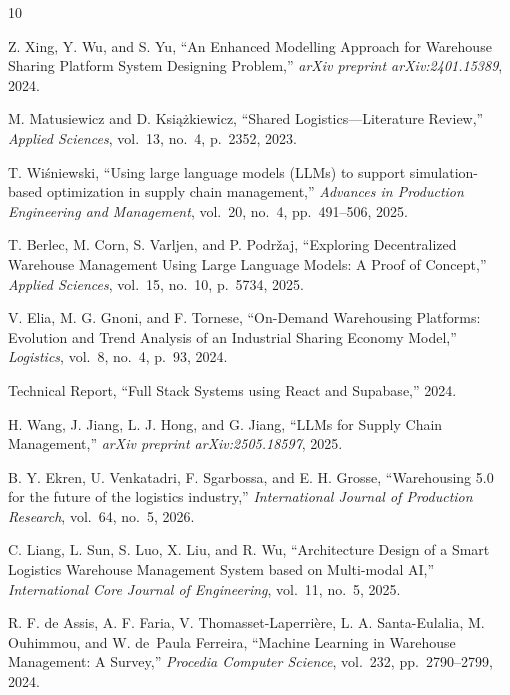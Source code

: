 \documentclass[pdflatex,sn-mathphys-num]{sn-jnl}
\theoremstyle{thmstyleone}
\theoremstyle{thmstyletwo}
\theoremstyle{thmstylethree}
\begin{document}

\begin{thebibliography}{10}

Z. Xing, Y. Wu, and S. Yu,
``An Enhanced Modelling Approach for Warehouse Sharing Platform
System Designing Problem,''
\textit{arXiv preprint arXiv:2401.15389},
2024.

M. Matusiewicz and D. Ksi\k{a}\.zkiewicz,
``Shared Logistics---Literature Review,''
\textit{Applied Sciences},
vol.~13, no.~4, p.~2352,
2023.

T. Wi\'{s}niewski,
``Using large language models (LLMs) to support
simulation-based optimization in supply chain management,''
\textit{Advances in Production Engineering and Management},
vol.~20, no.~4, pp.~491--506,
2025.

T. Berlec, M. Corn, S. Varljen, and P. Podr\v{z}aj,
``Exploring Decentralized Warehouse Management Using
Large Language Models: A Proof of Concept,''
\textit{Applied Sciences},
vol.~15, no.~10, p.~5734,
2025.

V. Elia, M. G. Gnoni, and F. Tornese,
``On-Demand Warehousing Platforms: Evolution and Trend Analysis
of an Industrial Sharing Economy Model,''
\textit{Logistics},
vol.~8, no.~4, p.~93,
2024.

Technical Report,
``Full Stack Systems using React and Supabase,''
2024.

H. Wang, J. Jiang, L. J. Hong, and G. Jiang,
``LLMs for Supply Chain Management,''
\textit{arXiv preprint arXiv:2505.18597},
2025.

B. Y. Ekren, U. Venkatadri, F. Sgarbossa,
and E. H. Grosse,
``Warehousing 5.0 for the future of the logistics industry,''
\textit{International Journal of Production Research},
vol.~64, no.~5,
2026.

C. Liang, L. Sun, S. Luo, X. Liu, and R. Wu,
``Architecture Design of a Smart Logistics Warehouse
Management System based on Multi-modal AI,''
\textit{International Core Journal of Engineering},
vol.~11, no.~5,
2025.

R. F. de Assis, A. F. Faria,
V. Thomasset-Laperri\`{e}re,
L. A. Santa-Eulalia, M. Ouhimmou,
and W. de~Paula Ferreira,
``Machine Learning in Warehouse Management: A Survey,''
\textit{Procedia Computer Science},
vol.~232, pp.~2790--2799,
2024.

\end{thebibliography}
\end{document}
